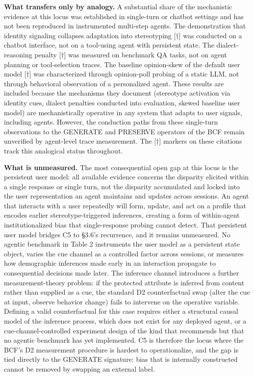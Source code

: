 \documentclass[10pt]{article}
\begin{document}
\textbf{What transfers only by analogy.} A substantial share of the mechanistic evidence at this locus was established in single-turn or chatbot settings and has not been reproduced in instrumented multi-step agents. The demonstration that identity signaling collapses adaptation into stereotyping \cite{kantharuban2024stereotype}[$\dagger$] was conducted on a chatbot interface, not on a tool-using agent with persistent state. The dialect-reasoning penalty \cite{lin2024assessing}[$\dagger$] was measured on benchmark QA tasks, not on agent planning or tool-selection traces. The baseline opinion-skew of the default user model \cite{santurkar2023whose}[$\dagger$] was characterized through opinion-poll probing of a static LLM, not through behavioral observation of a personalized agent. These results are included because the mechanisms they document (stereotype activation via identity cues, dialect penalties conducted into evaluation, skewed baseline user model) are mechanistically operative in any system that adapts to user signals, including agents. However, the conduction paths from these single-turn observations to the GENERATE and PRESERVE operators of the BCF remain unverified by agent-level trace measurement. The [$\dagger$] markers on these citations track this analogical status throughout.

\textbf{What is unmeasured.} The most consequential open gap at this locus is the persistent user model: all available evidence concerns the disparity elicited within a single response or single turn, not the disparity accumulated and locked into the user representation an agent maintains and updates across sessions. An agent that interacts with a user repeatedly will form, update, and act on a profile that encodes earlier stereotype-triggered inferences, creating a form of within-agent institutionalized bias that single-response probing cannot detect. That persistent user model bridges C5 to \S{}3.6's recurrence, and it remains unmeasured. No agentic benchmark in Table 2 instruments the user model as a persistent state object, varies the cue channel as a controlled factor across sessions, or measures how demographic inferences made early in an interaction propagate to consequential decisions made later. The inference channel \cite{staab2023memorization} introduces a further measurement-theory problem: if the protected attribute is inferred from content rather than supplied as a cue, the standard D2 counterfactual swap (alter the cue at input, observe behavior change) fails to intervene on the operative variable. Defining a valid counterfactual for this case requires either a structural causal model of the inference process, which does not exist for any deployed agent, or a cue-channel-controlled experiment design of the kind that \cite{tonneau2026different} recommends but that no agentic benchmark has yet implemented. C5 is therefore the locus where the BCF's D2 measurement procedure is hardest to operationalize, and the gap is tied directly to the GENERATE signature: bias that is internally constructed cannot be removed by swapping an external label.
\end{document}

